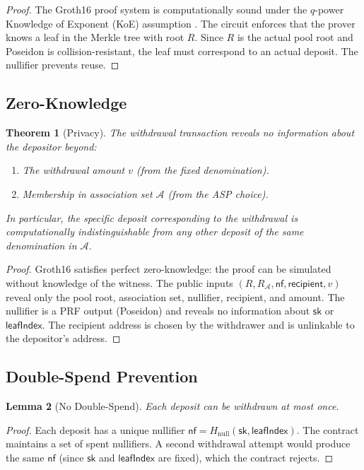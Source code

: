 \documentclass[11pt,a4paper]{article}
\newtheorem{theorem}{Theorem}
\newtheorem{lemma}[theorem]{Lemma}
\begin{document}
\begin{proof}
The Groth16 proof system is computationally sound under the $q$-power Knowledge of Exponent (KoE) assumption \cite{groth2016size}. The circuit enforces that the prover knows a leaf in the Merkle tree with root $R$. Since $R$ is the actual pool root and Poseidon is collision-resistant, the leaf must correspond to an actual deposit. The nullifier prevents reuse.
\end{proof}

\subsection{Zero-Knowledge}

\begin{theorem}[Privacy]
The withdrawal transaction reveals no information about the depositor beyond:
\begin{enumerate}
    \item The withdrawal amount $v$ (from the fixed denomination).
    \item Membership in association set $\mathcal{A}$ (from the ASP choice).
\end{enumerate}
In particular, the specific deposit corresponding to the withdrawal is computationally indistinguishable from any other deposit of the same denomination in $\mathcal{A}$.
\end{theorem}

\begin{proof}
Groth16 satisfies perfect zero-knowledge: the proof can be simulated without knowledge of the witness. The public inputs $(R, R_{\mathcal{A}}, \mathsf{nf}, \mathsf{recipient}, v)$ reveal only the pool root, association set, nullifier, recipient, and amount. The nullifier is a PRF output (Poseidon) and reveals no information about $\mathsf{sk}$ or $\mathsf{leafIndex}$. The recipient address is chosen by the withdrawer and is unlinkable to the depositor's address.
\end{proof}

\subsection{Double-Spend Prevention}

\begin{lemma}[No Double-Spend]
Each deposit can be withdrawn at most once.
\end{lemma}

\begin{proof}
Each deposit has a unique nullifier $\mathsf{nf} = H_{\text{null}}(\mathsf{sk}, \mathsf{leafIndex})$. The contract maintains a set of spent nullifiers. A second withdrawal attempt would produce the same $\mathsf{nf}$ (since $\mathsf{sk}$ and $\mathsf{leafIndex}$ are fixed), which the contract rejects.
\end{proof}
\end{document}
